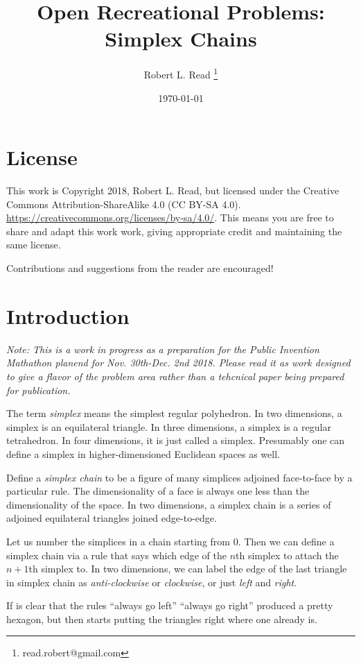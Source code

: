 \documentclass[11pt]{article}
\title{Open Recreational Problems: Simplex Chains}
\author{Robert L. Read
  \thanks{read.robert@gmail.com}
}
\affil{Founder, Public Invention, an educational non-profit.}
\date{\today}
\begin{document}
\maketitle


\section{License}
This work is Copyright 2018, Robert L. Read, but licensed under the Creative Commons Attribution-ShareAlike 4.0 (CC BY-SA 4.0).
\url{https://creativecommons.org/licenses/by-sa/4.0/}. This means you are free to share and adapt this work work, giving appropriate credit
and maintaining the same license.

Contributions and suggestions from the reader are encouraged!

\section{Introduction}

{\em
Note: This is a work in progress as a preparation for the Public Invention Mathathon planend for Nov. 30th-Dec. 2nd 2018.
Please read it as work designed to give a flavor of the problem area rather than a tehcnical paper being prepared for publication.
}

The term {\em simplex} means the simplest regular polyhedron. In two dimensions, a simplex is an equilateral triangle.
In three dimensions, a simplex is a regular tetrahedron. In four dimensions, it is just called a simplex.
Presumably one can define a simplex in higher-dimensioned Euclidean spaces as well.

Define a {\em simplex chain} to be a figure of many simplices adjoined face-to-face by a particular rule.
The dimensionality of a face is always one less than the dimensionality of the space. In two dimensions,
a simplex chain is a series of adjoined equilateral triangles joined edge-to-edge.

Let us number the simplices in a chain starting from $0$. Then we can define a simplex chain via a rule
that says which edge of the $n$th simplex to attach the $n+1$th simplex to. In two dimensions, we can
label the edge of the last triangle in simplex chain as {\em anti-clockwise} or {\em clockwise}, or just
{\em left} and {\em right}.

If is clear that the rules ``always go left'' ``always go right'' produced a pretty hexagon, but then starts putting the triangles
right where one already is.
\end{document}
